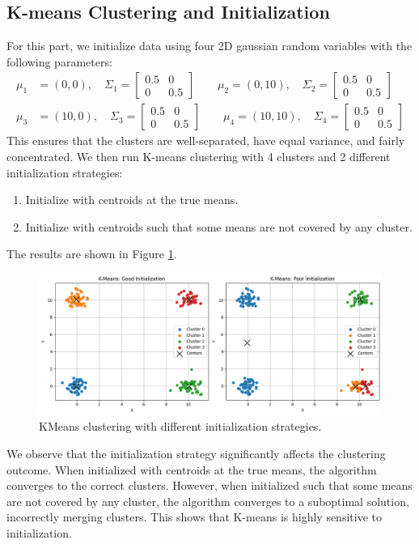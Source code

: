 \documentclass{article}
\begin{document}
\subsection*{K-means Clustering and Initialization}
For this part, we initialize data using four 2D gaussian random variables with the following parameters:
\begin{align*}
    \mu_1 &= (0, 0), \quad \Sigma_1 = \begin{bmatrix} 0.5 & 0 \\ 0 & 0.5 \end{bmatrix}\qquad\mu_2 = (0, 10), \quad \Sigma_2 = \begin{bmatrix} 0.5 & 0 \\ 0 & 0.5 \end{bmatrix}\\
    \mu_3 &= (10, 0), \quad \Sigma_3 = \begin{bmatrix} 0.5 & 0 \\ 0 & 0.5 \end{bmatrix}\qquad\mu_4 = (10, 10), \quad \Sigma_4 = \begin{bmatrix} 0.5 & 0 \\ 0 & 0.5 \end{bmatrix}
\end{align*}
This ensures that the clusters are well-separated, have equal variance, and fairly concentrated. We then run K-means clustering with 4 clusters and 2 different initialization strategies:
\begin{enumerate}
    \item Initialize with centroids at the true means.
    \item Initialize with centroids such that some means are not covered by any cluster.
\end{enumerate}
The results are shown in Figure \ref{fig:knn-init}.
\begin{figure}[ht]
    \centering
    \includegraphics[width=1\textwidth]{knn-gauss.png}
    \caption{KMeans clustering with different initialization strategies.}
    \label{fig:knn-init}
\end{figure}
We observe that the initialization strategy significantly affects the clustering outcome. When initialized with centroids at the true means, the algorithm converges to the correct clusters. However, when initialized such that some means are not covered by any cluster, the algorithm converges to a suboptimal solution, incorrectly merging clusters. This shows that K-means is highly sensitive to initialization.
\end{document}
